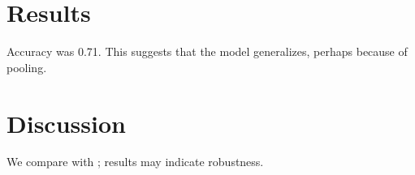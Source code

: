 
\section{Results}
Accuracy was 0.71. This suggests that the model generalizes, perhaps because of pooling.
\section{Discussion}
We compare with \cite{a}; results may indicate robustness.

